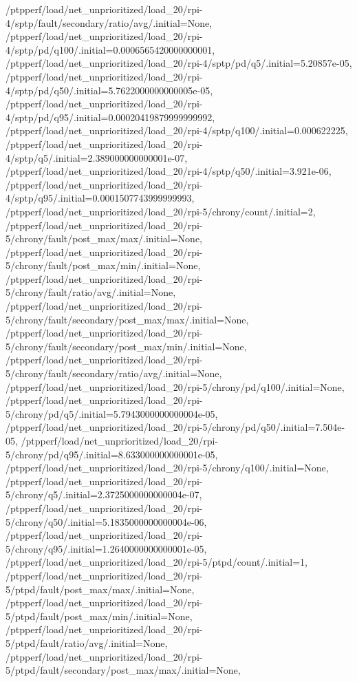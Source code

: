 {    /ptpperf/load/net_unprioritized/load_20/rpi-4/sptp/fault/secondary/ratio/avg/.initial=None,
    /ptpperf/load/net_unprioritized/load_20/rpi-4/sptp/pd/q100/.initial=0.0006565420000000001,
    /ptpperf/load/net_unprioritized/load_20/rpi-4/sptp/pd/q5/.initial=5.20857e-05,
    /ptpperf/load/net_unprioritized/load_20/rpi-4/sptp/pd/q50/.initial=5.7622000000000005e-05,
    /ptpperf/load/net_unprioritized/load_20/rpi-4/sptp/pd/q95/.initial=0.00020419879999999992,
    /ptpperf/load/net_unprioritized/load_20/rpi-4/sptp/q100/.initial=0.000622225,
    /ptpperf/load/net_unprioritized/load_20/rpi-4/sptp/q5/.initial=2.389000000000001e-07,
    /ptpperf/load/net_unprioritized/load_20/rpi-4/sptp/q50/.initial=3.921e-06,
    /ptpperf/load/net_unprioritized/load_20/rpi-4/sptp/q95/.initial=0.0001507743999999993,
    /ptpperf/load/net_unprioritized/load_20/rpi-5/chrony/count/.initial=2,
    /ptpperf/load/net_unprioritized/load_20/rpi-5/chrony/fault/post_max/max/.initial=None,
    /ptpperf/load/net_unprioritized/load_20/rpi-5/chrony/fault/post_max/min/.initial=None,
    /ptpperf/load/net_unprioritized/load_20/rpi-5/chrony/fault/ratio/avg/.initial=None,
    /ptpperf/load/net_unprioritized/load_20/rpi-5/chrony/fault/secondary/post_max/max/.initial=None,
    /ptpperf/load/net_unprioritized/load_20/rpi-5/chrony/fault/secondary/post_max/min/.initial=None,
    /ptpperf/load/net_unprioritized/load_20/rpi-5/chrony/fault/secondary/ratio/avg/.initial=None,
    /ptpperf/load/net_unprioritized/load_20/rpi-5/chrony/pd/q100/.initial=None,
    /ptpperf/load/net_unprioritized/load_20/rpi-5/chrony/pd/q5/.initial=5.7943000000000004e-05,
    /ptpperf/load/net_unprioritized/load_20/rpi-5/chrony/pd/q50/.initial=7.504e-05,
    /ptpperf/load/net_unprioritized/load_20/rpi-5/chrony/pd/q95/.initial=8.633000000000001e-05,
    /ptpperf/load/net_unprioritized/load_20/rpi-5/chrony/q100/.initial=None,
    /ptpperf/load/net_unprioritized/load_20/rpi-5/chrony/q5/.initial=2.3725000000000004e-07,
    /ptpperf/load/net_unprioritized/load_20/rpi-5/chrony/q50/.initial=5.1835000000000004e-06,
    /ptpperf/load/net_unprioritized/load_20/rpi-5/chrony/q95/.initial=1.2640000000000001e-05,
    /ptpperf/load/net_unprioritized/load_20/rpi-5/ptpd/count/.initial=1,
    /ptpperf/load/net_unprioritized/load_20/rpi-5/ptpd/fault/post_max/max/.initial=None,
    /ptpperf/load/net_unprioritized/load_20/rpi-5/ptpd/fault/post_max/min/.initial=None,
    /ptpperf/load/net_unprioritized/load_20/rpi-5/ptpd/fault/ratio/avg/.initial=None,
    /ptpperf/load/net_unprioritized/load_20/rpi-5/ptpd/fault/secondary/post_max/max/.initial=None,
}
